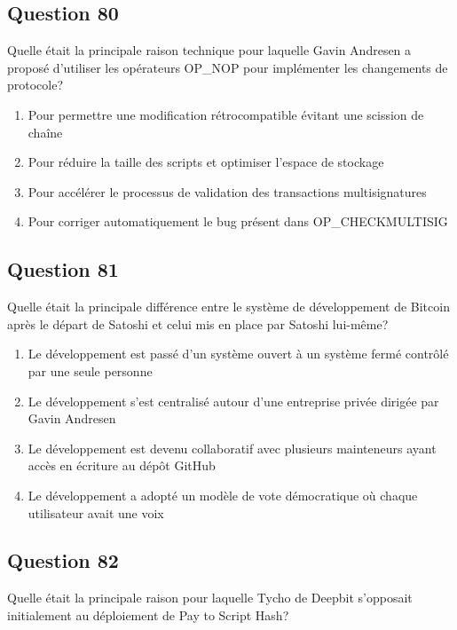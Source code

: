 \documentclass[12pt,a4paper]{article}
\begin{document}
\bigskip


\subsection*{Question 80}
Quelle était la principale raison technique pour laquelle Gavin Andresen a proposé d'utiliser les opérateurs OP_NOP pour implémenter les changements de protocole?

\begin{enumerate}[label=\Alph*., leftmargin=*]
\item Pour permettre une modification rétrocompatible évitant une scission de chaîne
\item Pour réduire la taille des scripts et optimiser l'espace de stockage
\item Pour accélérer le processus de validation des transactions multisignatures
\item Pour corriger automatiquement le bug présent dans OP_CHECKMULTISIG
\end{enumerate}

\bigskip


\subsection*{Question 81}
Quelle était la principale différence entre le système de développement de Bitcoin après le départ de Satoshi et celui mis en place par Satoshi lui-même?

\begin{enumerate}[label=\Alph*., leftmargin=*]
\item Le développement est passé d'un système ouvert à un système fermé contrôlé par une seule personne
\item Le développement s'est centralisé autour d'une entreprise privée dirigée par Gavin Andresen
\item Le développement est devenu collaboratif avec plusieurs mainteneurs ayant accès en écriture au dépôt GitHub
\item Le développement a adopté un modèle de vote démocratique où chaque utilisateur avait une voix
\end{enumerate}

\bigskip


\subsection*{Question 82}
Quelle était la principale raison pour laquelle Tycho de Deepbit s'opposait initialement au déploiement de Pay to Script Hash?
\end{document}
